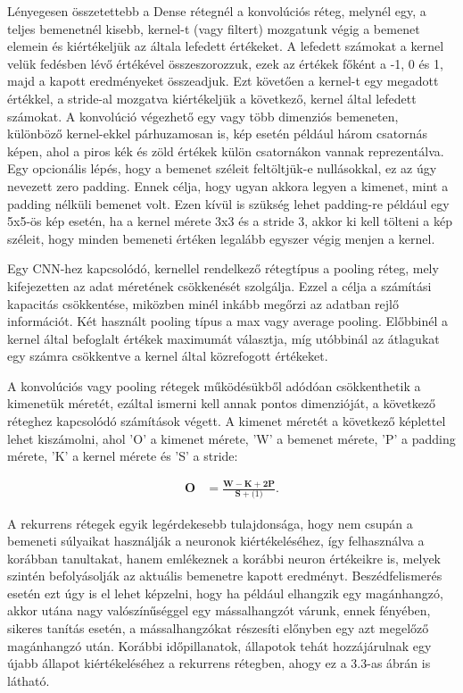 Lényegesen összetettebb a Dense rétegnél a konvolúciós réteg\cite{cnn}, melynél egy, a teljes bemenetnél kisebb, kernel-t (vagy filtert) mozgatunk végig a bemenet elemein és kiértékeljük az általa lefedett értékeket. A lefedett számokat a kernel velük fedésben lévő értékével összeszorozzuk, ezek az értékek főként a -1, 0 és 1, majd a kapott eredményeket összeadjuk. Ezt követően a kernel-t egy megadott értékkel, a stride-al mozgatva kiértékeljük a következő, kernel által lefedett számokat. A konvolúció végezhető egy vagy több dimenziós bemeneten, különböző kernel-ekkel párhuzamosan is, kép esetén például három csatornás képen, ahol a piros kék és zöld értékek külön csatornákon vannak reprezentálva. Egy opcionális lépés, hogy a bemenet széleit feltöltjük-e nullásokkal, ez az úgy nevezett zero padding. Ennek célja, hogy ugyan akkora legyen a kimenet, mint a padding nélküli bemenet volt. Ezen kívül is szükség lehet padding-re például egy 5x5-ös kép esetén, ha a kernel mérete 3x3 és a stride 3, akkor ki kell tölteni a kép széleit, hogy minden bemeneti értéken legalább egyszer végig menjen a kernel.

Egy CNN-hez kapcsolódó, kernellel rendelkező rétegtípus a pooling réteg, mely kifejezetten az adat méretének csökkenését szolgálja. Ezzel a célja a számítási kapacitás csökkentése, miközben minél inkább megőrzi az adatban rejlő információt. Két használt pooling típus a max vagy average pooling. Előbbinél a kernel által befoglalt értékek maximumát választja, míg utóbbinál az átlagukat egy számra csökkentve a kernel által közrefogott értékeket.

A konvolúciós vagy pooling rétegek működésükből adódóan csökkenthetik a kimenetük méretét, ezáltal ismerni kell annak pontos dimenzióját, a következő réteghez kapcsolódó számítások végett. A kimenet méretét a következő képlettel lehet kiszámolni, ahol ’O’ a kimenet mérete, ’W’ a bemenet mérete, ’P’ a padding mérete, ’K’ a kernel mérete és ’S’ a stride:

\begin{align}
\mathbf{O}&=\frac{\mathbf{W}-\mathbf{K}+\mathbf{2P}}{\mathbf{S}+\mathbf(1)}.
\end{align}

A rekurrens rétegek\cite{rnn} egyik legérdekesebb tulajdonsága, hogy nem csupán a bemeneti súlyaikat használják a neuronok kiértékeléséhez, így felhasználva a korábban tanultakat, hanem emlékeznek a korábbi neuron értékeikre is, melyek szintén befolyásolják az aktuális bemenetre kapott eredményt. Beszédfelismerés esetén ezt úgy is el lehet képzelni, hogy ha például elhangzik egy magánhangzó, akkor utána nagy valószínűséggel egy mássalhangzót várunk, ennek fényében, sikeres tanítás esetén, a mássalhangzókat részesíti előnyben egy azt megelőző magánhangzó után. Korábbi időpillanatok, állapotok tehát hozzájárulnak egy újabb állapot kiértékeléséhez a rekurrens rétegben, ahogy ez a 3.3-as ábrán is látható.
 
